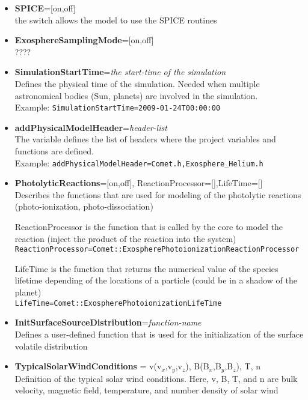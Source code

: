 \begin{itemize} 
\item {\bf SPICE}=[on,off] \\ the switch allows the model to use the SPICE routines
\item {\bf ExosphereSamplingMode}=[on,off] \\ ????
\item {\bf SimulationStartTime}={\it the start-time of the simulation} \\ Defines the physical time of the simulation. Needed when multiple astronomical bodies (Sun, planets) are involved in the simulation. \\
Example: {\tt SimulationStartTime=2009-01-24T00:00:00}
\item{\bf addPhysicalModelHeader}={\it header-list} \\ The variable defines the list of headers where the project variables and functions are defined. \\ Example: {\tt addPhysicalModelHeader=Comet.h,Exosphere\_Helium.h}
\item {\bf PhotolyticReactions}=[on,off], ReactionProcessor=[],LifeTime=[]  \\ Describes the functions that are used for modeling of the photolytic reactions (photo-ionization, photo-dissociation)

ReactionProcessor is the function that is called by the core to model the reaction (inject the product of the reaction into the system) \\ {\tt ReactionProcessor=Comet::ExospherePhotoionizationReactionProcessor}

LifeTime is the function that returns the numerical value of the species lifetime depending of the locations of a particle (could be in a shadow of the planet) \\ 
{\tt LifeTime=Comet::ExospherePhotoionizationLifeTime} 


\item {\bf InitSurfaceSourceDistribution}={\it function-name} \\ Defines a user-defined function that is used for the initialization of the surface volatile distribution 

\item {\bf TypicalSolarWindConditions} = v(v$_x$,v$_y$,v$_z$), B(B$_x$,B$_y$,B$_z$), T, n \\ Definition of the typical solar wind conditions. Here, v, B, T, and n are bulk velocity, magnetic field, temperature, and number density of solar wind


\end{itemize}
